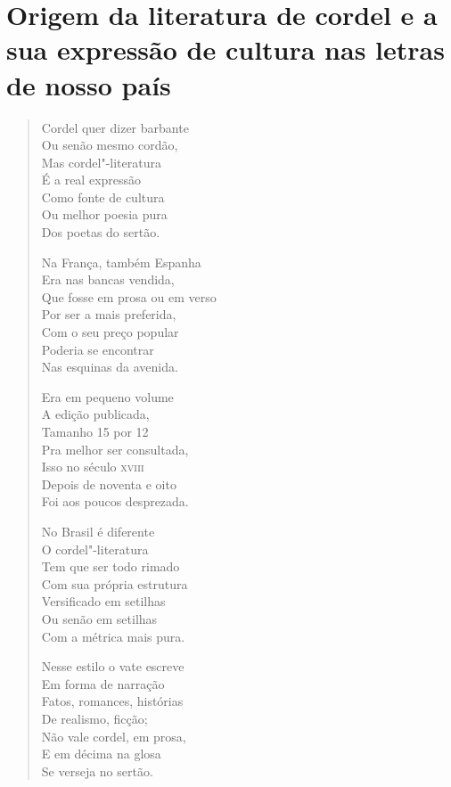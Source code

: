 \chapter{Origem da literatura de cordel e a sua expressão de cultura nas letras de nosso país}

\begin{verse}
Cordel quer dizer barbante \\
Ou senão mesmo cordão, \\
Mas cordel"-literatura \\
É a real expressão \\
Como fonte de cultura \\
Ou melhor poesia pura \\
Dos poetas do sertão. 

Na França, também Espanha \\
Era nas bancas vendida, \\
Que fosse em prosa ou em verso \\
Por ser a mais preferida, \\
Com o seu preço popular \\
Poderia se encontrar \\
Nas esquinas da avenida. 


Era em pequeno volume \\
A edição publicada, \\
Tamanho 15 por 12 \\
Pra melhor ser consultada, \\
Isso no século \textsc{xviii} \\
Depois de noventa e oito \\
Foi aos poucos desprezada. 

No Brasil é diferente \\
O cordel"-literatura \\
Tem que ser todo rimado \\
Com sua própria estrutura \\
Versificado em setilhas \\
Ou senão em setilhas \\
Com a métrica mais pura. 

Nesse estilo o vate escreve \\
Em forma de narração \\
Fatos, romances, histórias \\
De realismo, ficção; \\
Não vale cordel, em prosa, \\
E em décima na glosa \\
Se verseja no sertão. 


\end{verse}
